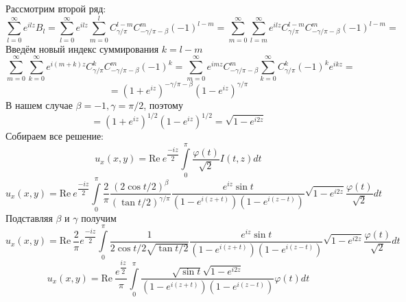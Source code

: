 \documentclass[12pt, a4paper]{article}
\begin{document}
	Рассмотрим второй ряд:
	\begin{equation*}
		\sum\limits_{l =0 }^{\infty} e^{ilz} B_{l} = \sum\limits_{l =0 }^{\infty} e^{ilz} \sum\limits_{m=0}^{l} C^{l - m}_{\gamma/\pi} C^{m}_{-\gamma/\pi - \beta} (-1)^{l-m} = \sum\limits_{m=0}^{\infty} \sum\limits_{l=m}^{\infty} e^{ilz} C^{l - m}_{\gamma/\pi} C^{m}_{-\gamma/\pi - \beta} (-1)^{l-m} = 
	\end{equation*}
	Введём новый индекс суммирования $k = l -m$
	\begin{equation*}
		\sum\limits_{m=0}^{\infty} \sum\limits_{k=0}^{\infty} e^{i(m+k)z} C^{k}_{\gamma/\pi} C^{m}_{-\gamma/\pi - \beta} (-1)^{k} = \sum\limits_{m=0}^{\infty} e^{imz} C^{m}_{-\gamma/\pi - \beta} \sum\limits_{k=0}^{\infty}  C^{k}_{\gamma/\pi} (-1)^k e^{ikz} = 
	\end{equation*}
	\begin{equation*}
		= (1 + e^{iz})^{-\gamma/\pi - \beta} (1- e^{iz})^{\gamma/\pi} 
	\end{equation*}
	В нашем случае $\beta = -1, \gamma = \pi/2$, поэтому
	\begin{equation*}
		= (1 + e^{iz})^{1/2} (1- e^{iz})^{1/2} =\sqrt{1 - e^{i2z}} 
	\end{equation*}
	Собираем все решение:
	\begin{equation*}
		u_x(x,y) = \mathrm{Re} \ e^{\dfrac{-iz}{2}} \int\limits_0^\pi \dfrac{\varphi(t)}{\sqrt2} I(t,z) dt 
	\end{equation*}
	\begin{equation*}
		u_x(x,y) = \mathrm{Re} \ e^{\dfrac{-iz}{2}} \int\limits_0^\pi \dfrac{2}{\pi}\dfrac{(2\cos{t/2})^\beta}{(\tan{t/2})^{\gamma/\pi}}  \dfrac{e^{iz} \sin{t}}{\left(1 - e^{i(z+t)} \right) \left(1 - e^{i(z-t)}\right)} \sqrt{1 - e^{i2z}} \dfrac{\varphi(t)}{\sqrt2} dt
	\end{equation*}
	Подставляя $\beta$ и $\gamma$ получим
	\begin{equation*}
		u_x(x,y) = \mathrm{Re} \  \dfrac{2}{\pi} e^{\dfrac{-iz}{2}} \int\limits_0^\pi \dfrac{1}{2\cos{t/2} \sqrt{\tan{t/2}}}  \dfrac{e^{iz} \sin{t}}{\left(1 - e^{i(z+t)} \right) \left(1 - e^{i(z-t)}\right)} \sqrt{1 - e^{i2z}} \dfrac{\varphi(t)}{\sqrt2} dt
	\end{equation*}
	\begin{equation*}
		u_x(x,y) = \mathrm{Re} \  \dfrac{e^{\dfrac{iz}{2}}}{\pi}  \int\limits_0^\pi  \dfrac{\sqrt{\sin{t}} \sqrt{1 - e^{i2z}}}{\left(1 - e^{i(z+t)} \right) \left(1 - e^{i(z-t)}\right)}  \varphi(t) dt
	\end{equation*}
	
\end{document}
